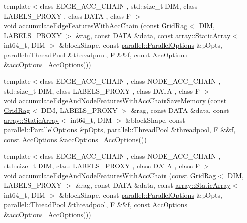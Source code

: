 \begin{DoxyCompactItemize}
{\footnotesize template$<$class E\+D\+G\+E\+\_\+\+A\+C\+C\+\_\+\+C\+H\+A\+IN , std\+::size\+\_\+t D\+IM, class L\+A\+B\+E\+L\+S\+\_\+\+P\+R\+O\+XY , class D\+A\+TA , class F $>$ }\\void \hyperlink{namespacenifty_1_1graph_a367cdb1cc5ac050b60098dc22effd452}{accumulate\+Edge\+Features\+With\+Acc\+Chain} (const \hyperlink{classnifty_1_1graph_1_1GridRag}{Grid\+Rag}$<$ D\+IM, L\+A\+B\+E\+L\+S\+\_\+\+P\+R\+O\+XY $>$ \&rag, const D\+A\+TA \&data, const \hyperlink{namespacenifty_1_1array_a683f151f19c851754e0c6d55ed16a0c2}{array\+::\+Static\+Array}$<$ int64\+\_\+t, D\+IM $>$ \&block\+Shape, const \hyperlink{classnifty_1_1parallel_1_1ParallelOptions}{parallel\+::\+Parallel\+Options} \&p\+Opts, \hyperlink{classnifty_1_1parallel_1_1ThreadPool}{parallel\+::\+Thread\+Pool} \&threadpool, F \&\&f, const \hyperlink{structnifty_1_1graph_1_1AccOptions}{Acc\+Options} \&acc\+Options=\hyperlink{structnifty_1_1graph_1_1AccOptions}{Acc\+Options}())
\item 
{\footnotesize template$<$class E\+D\+G\+E\+\_\+\+A\+C\+C\+\_\+\+C\+H\+A\+IN , class N\+O\+D\+E\+\_\+\+A\+C\+C\+\_\+\+C\+H\+A\+IN , std\+::size\+\_\+t D\+IM, class L\+A\+B\+E\+L\+S\+\_\+\+P\+R\+O\+XY , class D\+A\+TA , class F $>$ }\\void \hyperlink{namespacenifty_1_1graph_a8bba7bf00968cb611c2b01bddfe6f2fd}{accumulate\+Edge\+And\+Node\+Features\+With\+Acc\+Chain\+Save\+Memory} (const \hyperlink{classnifty_1_1graph_1_1GridRag}{Grid\+Rag}$<$ D\+IM, L\+A\+B\+E\+L\+S\+\_\+\+P\+R\+O\+XY $>$ \&rag, const D\+A\+TA \&data, const \hyperlink{namespacenifty_1_1array_a683f151f19c851754e0c6d55ed16a0c2}{array\+::\+Static\+Array}$<$ int64\+\_\+t, D\+IM $>$ \&block\+Shape, const \hyperlink{classnifty_1_1parallel_1_1ParallelOptions}{parallel\+::\+Parallel\+Options} \&p\+Opts, \hyperlink{classnifty_1_1parallel_1_1ThreadPool}{parallel\+::\+Thread\+Pool} \&threadpool, F \&\&f, const \hyperlink{structnifty_1_1graph_1_1AccOptions}{Acc\+Options} \&acc\+Options=\hyperlink{structnifty_1_1graph_1_1AccOptions}{Acc\+Options}())
\item 
{\footnotesize template$<$class E\+D\+G\+E\+\_\+\+A\+C\+C\+\_\+\+C\+H\+A\+IN , class N\+O\+D\+E\+\_\+\+A\+C\+C\+\_\+\+C\+H\+A\+IN , std\+::size\+\_\+t D\+IM, class L\+A\+B\+E\+L\+S\+\_\+\+P\+R\+O\+XY , class D\+A\+TA , class F $>$ }\\void \hyperlink{namespacenifty_1_1graph_a8f3282d2d63b3f644bf2176ed21d3082}{accumulate\+Edge\+And\+Node\+Features\+With\+Acc\+Chain} (const \hyperlink{classnifty_1_1graph_1_1GridRag}{Grid\+Rag}$<$ D\+IM, L\+A\+B\+E\+L\+S\+\_\+\+P\+R\+O\+XY $>$ \&rag, const D\+A\+TA \&data, const \hyperlink{namespacenifty_1_1array_a683f151f19c851754e0c6d55ed16a0c2}{array\+::\+Static\+Array}$<$ int64\+\_\+t, D\+IM $>$ \&block\+Shape, const \hyperlink{classnifty_1_1parallel_1_1ParallelOptions}{parallel\+::\+Parallel\+Options} \&p\+Opts, \hyperlink{classnifty_1_1parallel_1_1ThreadPool}{parallel\+::\+Thread\+Pool} \&threadpool, F \&\&f, const \hyperlink{structnifty_1_1graph_1_1AccOptions}{Acc\+Options} \&acc\+Options=\hyperlink{structnifty_1_1graph_1_1AccOptions}{Acc\+Options}())

\end{DoxyCompactItemize}
